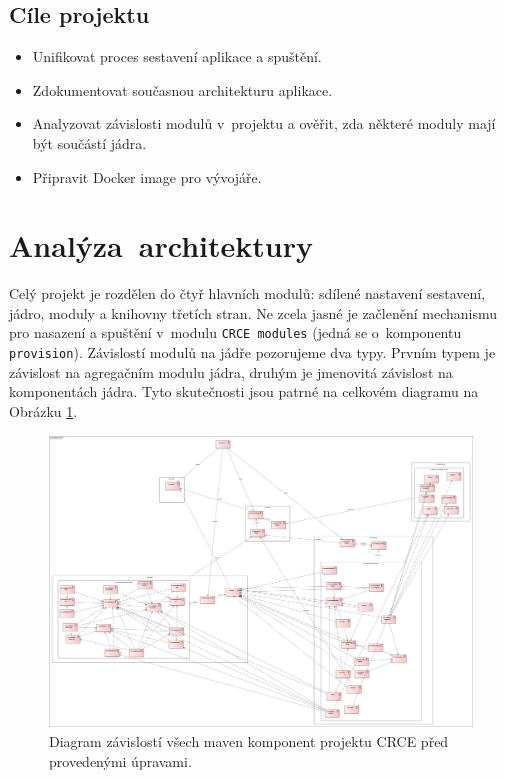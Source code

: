\documentclass[12pt, a4paper]{article}
\begin{document}
\subsection{Cíle projektu}

\begin{itemize}
	\item Unifikovat proces sestavení aplikace a spuštění.
	\item Zdokumentovat současnou architekturu aplikace.
	\item Analyzovat závislosti modulů v~projektu a ověřit, zda některé moduly mají být součástí jádra.
	\item Připravit Docker image pro vývojáře.
\end{itemize}

\newpage
\section{Analýza~architektury} %

Celý projekt je rozdělen do čtyř hlavních modulů: sdílené nastavení sestavení, jádro, moduly a knihovny třetích stran. Ne zcela jasné je začlenění mechanismu pro nasazení a spuštění v~modulu \texttt{CRCE modules} (jedná se o~komponentu \texttt{provision}). Závislostí modulů na jádře pozorujeme dva typy. Prvním typem je závislost na agregačním modulu jádra, druhým je jmenovitá závislost na komponentách jádra. Tyto skutečnosti jsou patrné na celkovém diagramu na Obrázku \ref{fig:wholeCRCE}.

\begin{figure}[h!]
\centering
\includegraphics[width=135mm]{wholeCRCE.png}
\caption{Diagram závislostí všech maven komponent projektu CRCE před provedenými úpravami.}
\label{fig:wholeCRCE}
\end{figure}
\end{document}

